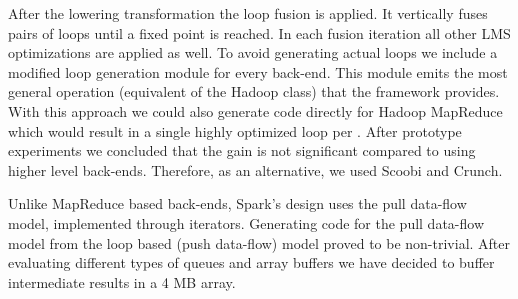 After the lowering transformation the loop fusion is applied. It vertically fuses pairs of loops until a fixed point is reached. In each fusion iteration all other LMS optimizations are applied as well. To avoid generating actual  loops we include a modified loop generation module for every back-end. This module emits the most general operation (equivalent of the Hadoop  class) that the framework provides. With this approach we could also generate code directly for Hadoop MapReduce which would result in a single highly optimized loop per . After prototype experiments we concluded that the gain is not significant compared to using higher level back-ends. Therefore, as an alternative, we used Scoobi and Crunch.

Unlike MapReduce based back-ends, Spark's design uses the pull data-flow model, implemented through iterators. Generating code for the pull data-flow model from the loop based (push data-flow) model proved to be non-trivial. After evaluating different types of queues and array buffers we have decided to buffer intermediate results in a 4 MB array.